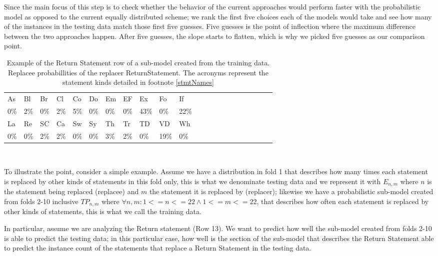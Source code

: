 \documentclass[conference]{IEEEtran}
\begin{document}
Since the main focus of this step is to check whether the behavior of the 
current approaches would perform faster with the probabilistic model as opposed 
to the current equally distributed scheme; we rank the first five choices each 
of the models would take and see how many of the instances in the testing data 
match those first five guesses. Five guesses is the point of inflection where the maximum difference between the two approaches happen. After five guesses, the slope starts to flatten, which is why we picked five guesses as our comparison point.

\begin{table}[ht]
\begin{tabular}{llllllllllllllllllllll}
\hline
As & Bl & Br & Cl & Co & Do & Em & EF & Ex & Fo & If \\
0\%&2\%&0\%&2\%&5\%&0\%&0\%&0\%&43\%&0\%&22\% \\
\hline 
La & Re & SC & Ca & Sw & Sy & Th & Tr & TD & VD & Wh \\
0\%&0\%&2\%&2\%&0\%&0\%&3\%&2\%&0\%&19\%&0\% \\
\hline
\end{tabular}
\\
\caption{Example of the Return Statement row of a sub-model created from 
the training data. Replacee probabillities of the replacer ReturnStatement. The acronyms represent the statement kinds detailed in footnote \ref{stmtNames}}
 \label{fig:exPredReturn} 
\end{table} 

% 

To illustrate the point, consider a simple example. Assume we have a 
distribution in fold 1 that describes how many times each statement is replaced 
by other kinds of statements in this fold 
only, this is what we denominate testing data and we represent it with $E_{n,m}$ 
where $n$ is the statement being replaced (replacee) and $m$ the statement it is 
replaced by (replacer); likewise we have a probabilistic sub-model created from 
folds 2-10 inclusive $TP_{n,m}$ where $\forall n,m: 1<=n<=22 \land 1<=m<=22$, 
that describes how often each statement is replaced by 
other kinds of statements, this is what we call the training data. 

In 
particular, assume we are analyzing the Return statement (Row 13). We want to 
predict 
how well the sub-model created from folds 2-10 is able to predict the testing 
data; in this particular case, how well is the section of the sub-model that 
describes the Return Statement able to predict the instance count of the 
statements that replace a Return Statement in the testing data.
\end{document}
